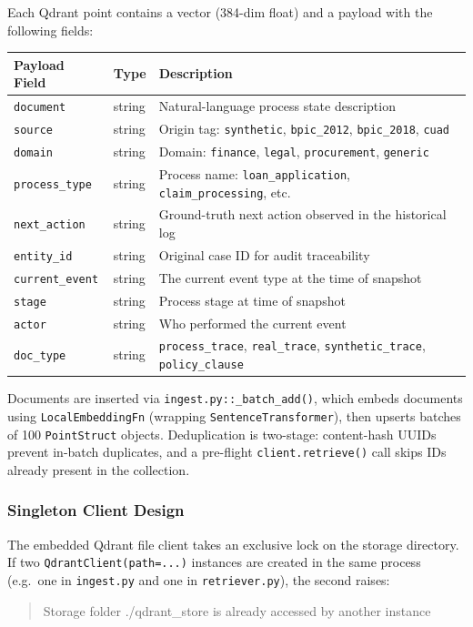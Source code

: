 \documentclass[12pt,a4paper]{article}
\begin{document}
Each Qdrant point contains a vector (384-dim float) and a payload with the following fields:

\begin{center}
\begin{longtable}{@{}lll@{}}
\toprule
\textbf{Payload Field} & \textbf{Type} & \textbf{Description} \\
\midrule
\endhead
\texttt{document} & string & Natural-language process state description \\
\texttt{source} & string & Origin tag: \texttt{synthetic}, \texttt{bpic\_2012}, \texttt{bpic\_2018}, \texttt{cuad} \\
\texttt{domain} & string & Domain: \texttt{finance}, \texttt{legal}, \texttt{procurement}, \texttt{generic} \\
\texttt{process\_type} & string & Process name: \texttt{loan\_application}, \texttt{claim\_processing}, etc. \\
\texttt{next\_action} & string & Ground-truth next action observed in the historical log \\
\texttt{entity\_id} & string & Original case ID for audit traceability \\
\texttt{current\_event} & string & The current event type at the time of snapshot \\
\texttt{stage} & string & Process stage at time of snapshot \\
\texttt{actor} & string & Who performed the current event \\
\texttt{doc\_type} & string & \texttt{process\_trace}, \texttt{real\_trace}, \texttt{synthetic\_trace}, \texttt{policy\_clause} \\
\bottomrule
\end{longtable}
\end{center}

Documents are inserted via \texttt{ingest.py::\_batch\_add()}, which embeds documents
using \texttt{LocalEmbeddingFn} (wrapping \texttt{SentenceTransformer}), then upserts
batches of 100 \texttt{PointStruct} objects. Deduplication is two-stage: content-hash
UUIDs prevent in-batch duplicates, and a pre-flight \texttt{client.retrieve()} call
skips IDs already present in the collection.

\subsubsection{Singleton Client Design}

The embedded Qdrant file client takes an exclusive lock on the storage directory.
If two \texttt{QdrantClient(path=...)} instances are created in the same process
(e.g.\ one in \texttt{ingest.py} and one in \texttt{retriever.py}), the second raises:
\begin{quote}\ttfamily Storage folder ./qdrant\_store is already accessed by another instance\end{quote}
\end{document}
